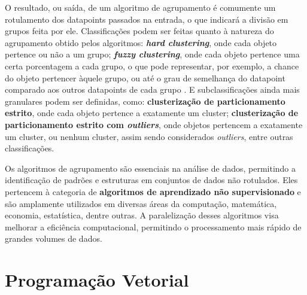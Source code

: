 \documentclass[12pt,
openright, 
oneside, %
a4paper,    %
brazil]{facom-ufu-abntex2}
\begin{document}
O resultado, ou saída, de um algoritmo de agrupamento é comumente um rotulamento dos datapoints passados na entrada, o que indicará a divisão em grupos feita por ele. Classificações podem ser feitas quanto à natureza do agrupamento obtido pelos algoritmos: \textbf{\textit{hard clustering}}, onde cada objeto pertence ou não a um grupo; \textbf{\textit{fuzzy clustering}}, onde cada objeto pertence uma certa porcentagem a cada grupo, o que pode representar, por exemplo, a chance do objeto pertencer àquele grupo, ou até o grau de semelhança do datapoint comparado aos outros datapoints de cada grupo \cite{FuzzyClusteringSurvey}. E subclassificações ainda mais granulares podem ser definidas, como: \textbf{clusterização de particionamento estrito}, onde cada objeto pertence a exatamente um cluster; \textbf{clusterização de particionamento estrito com \textit{outliers}}, onde objetos pertencem a exatamente um cluster, ou nenhum cluster, assim sendo considerados \textit{outliers}, entre outras classificações.

Os algoritmos de agrupamento são essenciais na análise de dados, permitindo a identificação de padrões e estruturas em conjuntos de dados não rotulados. Eles pertencem à categoria de \textbf{algoritmos de aprendizado não supervisionado} e são amplamente utilizados em diversas áreas da computação, matemática, economia, estatística, dentre outras. A paralelização desses algoritmos visa melhorar a eficiência computacional, permitindo o processamento mais rápido de grandes volumes de dados.




\section{Programação Vetorial}



\end{document}
